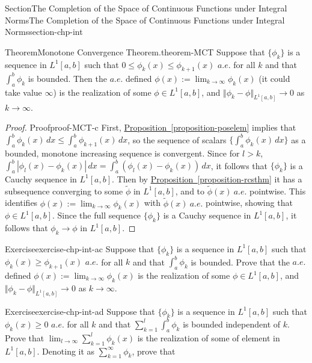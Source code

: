 \documentclass[oneside,10pt,]{article}
\newcommand{\xreffont}{\relax}
\numberwithin{equation}{section}
\begin{document}
\begin{sectionptx}{Section}{The Completion of the Space of Continuous Functions under Integral Norms}{}{The Completion of the Space of Continuous Functions under Integral Norms}{}{}{section-chp-int}
\begin{theorem}{Theorem}{Monotone Convergence Theorem.}{}{theorem-MCT}
Suppose that \(\{\phi_{k}\}\) is a sequence in \(L^{1}[a, b]\) such that \(0\le \phi_{k}(x)\le \phi_{k+1}(x)\) \(a.e.\) for all \(k\) and that \(\int_{a}^{b} \phi_{k}\) is bounded. Then the \(a.e.\) defined \(\phi (x) :=\lim_{k\to \infty} \phi_{k}(x)\) (it could take value \(\infty\)) is the realization of some \(\phi \in L^{1}[a, b]\), and \(\Vert \phi_{k}-\phi \Vert_{L^{1}[a, b]}\to 0\) as \(k\to \infty\).%
\end{theorem}
\begin{proof}{Proof}{}{proof-MCT-c}
First, \hyperref[proposition-poselem]{Proposition~{\xreffont\ref{proposition-poselem}}} implies that \(\int_{a}^{b} \phi_{k}(x)\, dx \le \int_{a}^{b} \phi_{k+1}(x)\, dx\), so the sequence of scalars \(\{ \int_{a}^{b} \phi_{k}(x)\, dx\}\) as a bounded, monotone increasing sequence is convergent. Since for \(l > k\), \(\int_{a}^{b} |\phi_{l}(x)-\phi_{k}(x)|\, dx= \int_{a}^{b} (\phi_{l}(x)-\phi_{k}(x))\, dx\), it follows that \(\{ \phi_{k}\}\) is a Cauchy sequence in \(L^{1}[a, b]\). Then by \hyperref[proposition-rcsthm]{Proposition~{\xreffont\ref{proposition-rcsthm}}} it has a subsequence converging to some \(\tilde \phi\) in \(L^{1}[a, b]\), and to \(\tilde \phi (x)\)\(\ a.e.\) pointwise. This identifies \(\phi (x) :=\lim_{k\to \infty} \phi_{k}(x)\) with \(\tilde \phi(x)\)\(\ a.e.\) pointwise, showing that \(\phi \in L^{1}[a, b]\). Since the full sequence \(\{ \phi_{k}\}\) is a Cauchy sequence in \(L^{1}[a, b]\), it follows that \(\phi_{k} \to \phi\) in \(L^{1}[a, b]\).\end{proof}
\begin{inlineexercise}{Exercise}{}{exercise-chp-int-ac}%
Suppose that \(\{\phi_{k}\}\) is a sequence in \(L^{1}[a, b]\) such that \(\phi_{k}(x)\ge \phi_{k+1}(x)\) \(a.e.\) for all \(k\) and that \(\int_{a}^{b} \phi_{k}\) is bounded. Prove that the \(a.e.\) defined \(\phi (x) :=\lim_{k\to \infty} \phi_{k}(x)\) is the realization of some \(\phi \in L^{1}[a, b]\), and \(\Vert \phi_{k}-\phi \Vert_{L^{1}[a, b]}\to 0\) as \(k\to \infty\).%
\end{inlineexercise}%
\begin{inlineexercise}{Exercise}{}{exercise-chp-int-ad}%
Suppose that \(\{\phi_{k}\}\) is a sequence in \(L^{1}[a, b]\) such that \(\phi_{k}(x)\ge 0\) \(a.e.\) for all \(k\) and that \(\sum_{k=1 }^{l}\int_{a}^{b} \phi_{k}\) is bounded independent of \(k\). Prove that \(\lim_{l\to\infty} \sum_{k=1 }^{l}\phi_{k}(x)\) is the realization of some of element in \(L^{1}[a, b]\). Denoting it as \(\sum_{k=1 }^{\infty}\phi_{k}\), prove that%
\begin{equation*}

\end{equation*}
\end{inlineexercise}
\end{sectionptx}
\end{document}
